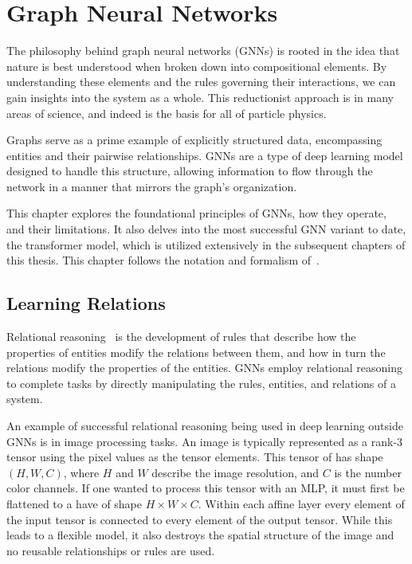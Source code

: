 \chapter{Graph Neural Networks}
\label{ch:gnns}

The philosophy behind graph neural networks (GNNs) is rooted in the idea that nature is best understood when broken down into compositional elements.
By understanding these elements and the rules governing their interactions, we can gain insights into the system as a whole.
This reductionist approach is in many areas of science, and indeed is the basis for all of particle physics.

Graphs serve as a prime example of explicitly structured data, encompassing entities and their pairwise relationships. GNNs are a type of deep learning model designed to handle this structure, allowing information to flow through the network in a manner that mirrors the graph's organization.

This chapter explores the foundational principles of GNNs, how they operate, and their limitations.
It also delves into the most successful GNN variant to date, the transformer model, which is utilized extensively in the subsequent chapters of this thesis.
This chapter follows the notation and formalism of~\textcite{RelationalInductiveBiases}.

\section{Learning Relations}

Relational reasoning~\cite{SimpleNeuralNetwork} is the development of rules that describe how the properties of entities modify the relations between them, and how in turn the relations modify the properties of the entities.
GNNs employ relational reasoning to complete tasks by directly manipulating the rules, entities, and relations of a system.

An example of successful relational reasoning being used in deep learning outside GNNs is in image processing tasks.
An image is typically represented as a rank-3 tensor using the pixel values as the tensor elements.
This tensor of has shape $(H, W, C)$, where $H$ and $W$ describe the image resolution, and $C$ is the number color channels.
If one wanted to process this tensor with an MLP, it must first be flattened to a have of shape $H \times W \times C$.
Within each affine layer every element of the input tensor is connected to every element of the output tensor.
While this leads to a flexible model, it also destroys the spatial structure of the image and no reusable relationships or rules are used.

